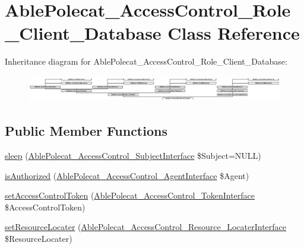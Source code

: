 \hypertarget{class_able_polecat___access_control___role___client___database}{}\section{Able\+Polecat\+\_\+\+Access\+Control\+\_\+\+Role\+\_\+\+Client\+\_\+\+Database Class Reference}
\label{class_able_polecat___access_control___role___client___database}
Inheritance diagram for Able\+Polecat\+\_\+\+Access\+Control\+\_\+\+Role\+\_\+\+Client\+\_\+\+Database\+:\begin{figure}[H]
\begin{center}
\leavevmode
\includegraphics[height=1.169916cm]{class_able_polecat___access_control___role___client___database}
\end{center}
\end{figure}
\subsection*{Public Member Functions}
\begin{DoxyCompactItemize}
\item 
\hyperlink{class_able_polecat___access_control___role___client___database_a365e24d7b066205cafa2a5cce3a4f224}{sleep} (\hyperlink{interface_able_polecat___access_control___subject_interface}{Able\+Polecat\+\_\+\+Access\+Control\+\_\+\+Subject\+Interface} \$Subject=N\+U\+L\+L)
\item 
\hyperlink{class_able_polecat___access_control___role___client___database_a544353080f75dc923ef2448de56ce63d}{is\+Authorized} (\hyperlink{interface_able_polecat___access_control___agent_interface}{Able\+Polecat\+\_\+\+Access\+Control\+\_\+\+Agent\+Interface} \$Agent)
\item 
\hyperlink{class_able_polecat___access_control___role___client___database_a936fbc8779daa15334c3c23f9d0e79d6}{set\+Access\+Control\+Token} (\hyperlink{interface_able_polecat___access_control___token_interface}{Able\+Polecat\+\_\+\+Access\+Control\+\_\+\+Token\+Interface} \$Access\+Control\+Token)
\item 
\hyperlink{class_able_polecat___access_control___role___client___database_ac8f41684603c278abcc5055f8ffe0790}{set\+Resource\+Locater} (\hyperlink{interface_able_polecat___access_control___resource___locater_interface}{Able\+Polecat\+\_\+\+Access\+Control\+\_\+\+Resource\+\_\+\+Locater\+Interface} \$Resource\+Locater)
\end{DoxyCompactItemize}
